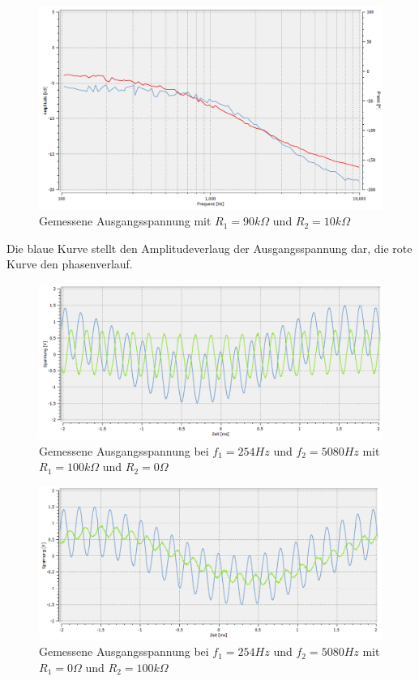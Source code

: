 \begin{figure}[htb]
    \includegraphics[width=16cm]{./pictures/Messungen/Gesamtschaltung_Test_90_10}
    \caption{Gemessene Ausgangsspannung mit $R_1 = 90k\Omega$ und $R_2 = 10k\Omega$}
    \label{fig:Gesamtschaltung_Test_90_10}
\end{figure}

Die blaue Kurve stellt den Amplitudeverlaug der Ausgangsspannung dar, die rote Kurve den phasenverlauf.

\newpage

\begin{figure}[htb]
    \includegraphics[width=16cm]{./pictures/Messungen/Ueberlagerung_100_0}
    \caption{Gemessene Ausgangsspannung bei $f_{1} = 254Hz$ und $f_{2} = 5080Hz$ mit $R_1 = 100k\Omega$ und $R_2 = 0\Omega$}
    \label{fig:Überlagerung_100_0}
\end{figure}

\begin{figure}[htb]
    \includegraphics[width=16cm]{./pictures/Messungen/Ueberlagerung_0_100}
    \caption{Gemessene Ausgangsspannung bei $f_{1} = 254Hz$ und $f_{2} = 5080Hz$ mit $R_1 = 0\Omega$ und $R_2 = 100k\Omega$}
    \label{fig:Überlagerung_0_100}
\end{figure}

